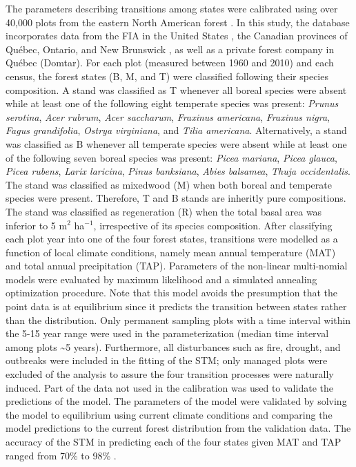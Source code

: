The parameters describing transitions among states were calibrated using
over 40,000 plots from the eastern North American forest
\citep{Vissault2020}. In this study, the database incorporates data from
the FIA in the United States \citep{OConnell2007}, the Canadian
provinces of Québec, Ontario, and New Brunswick
\citep{Naturelles2016, OMNR2014, Porter2001}, as well as a private
forest company in Québec (Domtar). For each plot (measured between 1960
and 2010) and each census, the forest states (B, M, and T) were
classified following their species composition. A stand was classified
as T whenever all boreal species were absent while at least one of the
following eight temperate species was present: \emph{Prunus serotina},
\emph{Acer rubrum}, \emph{Acer saccharum}, \emph{Fraxinus americana},
\emph{Fraxinus nigra}, \emph{Fagus grandifolia}, \emph{Ostrya
virginiana}, and \emph{Tilia americana}. Alternatively, a stand was
classified as B whenever all temperate species were absent while at
least one of the following seven boreal species was present: \emph{Picea
mariana}, \emph{Picea glauca}, \emph{Picea rubens}, \emph{Larix
laricina}, \emph{Pinus banksiana}, \emph{Abies balsamea}, \emph{Thuja
occidentalis}. The stand was classified as mixedwood (M) when both
boreal and temperate species were present. Therefore, T and B stands are
inheritly pure compositions. The stand was classified as regeneration
(R) when the total basal area was inferior to 5 m\(^2\) ha\(^{-1}\),
irrespective of its species composition. After classifying each plot
year into one of the four forest states, transitions were modelled as a
function of local climate conditions, namely mean annual temperature
(MAT) and total annual precipitation (TAP). Parameters of the non-linear
multi-nomial models were evaluated by maximum likelihood and a simulated
annealing optimization procedure. Note that this model avoids the
presumption that the point data is at equilibrium since it predicts the
transition between states rather than the distribution. Only permanent
sampling plots with a time interval within the 5-15 year range were used
in the parameterization (median time interval among plots
\textasciitilde5 years). Furthermore, all disturbances such as fire,
drought, and outbreaks were included in the fitting of the STM; only
managed plots were excluded of the analysis to assure the four
transition processes were naturally induced. Part of the data not used
in the calibration was used to validate the predictions of the model.
The parameters of the model were validated by solving the model to
equilibrium using current climate conditions and comparing the model
predictions to the current forest distribution from the validation data.
The accuracy of the STM in predicting each of the four states given MAT
and TAP ranged from 70\% to 98\% \citep{Vissault2020}.\\

